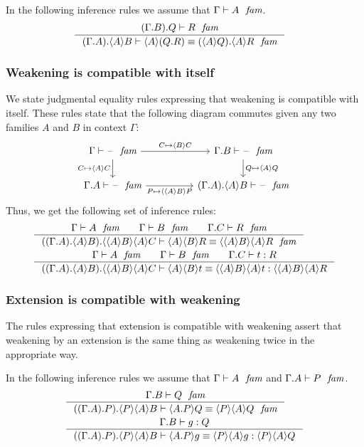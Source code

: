 In the following inference rules we assume that $\jfam{\Gamma}{A}$.
\begin{align}
& \inference
  {\jfam{{{\Gamma}{B}}{Q}}{R}}
  {\jfameq
    {\ctxext{{\Gamma}{A}}{\ctxwk{A}{B}}}
    {\ctxwk{A}{\ctxext{Q}{R}}}
    {\ctxext{\ctxwk{A}{Q}}{\ctxwk{A}{R}}}}
\end{align}

\subsubsection{Weakening is compatible with itself}\label{comp-ww}
We state judgmental equality rules expressing
that weakening is compatible with itself. These rules state that the following
diagram commutes given any two families $A$ and $B$ in context $\Gamma$:
\begin{equation*}
\begin{tikzcd}[column sep=huge]
\jfam{\Gamma}{\blank} \ar{r}{C\mapsto\ctxwk{B}{C}} \ar{d}[swap]{C\mapsto\ctxwk{A}{C}} & \jfam{{\Gamma}{B}}{\blank} \ar{d}{Q\mapsto\ctxwk{A}{Q}}\\
\jfam{{\Gamma}{A}}{\blank} \ar{r}[swap]{P\mapsto\ctxwk{{A}{B}}{P}} & \jfam{{{\Gamma}{A}}{\ctxwk{A}{B}}}{\blank}
\end{tikzcd}
\end{equation*}
Thus, we get the following set of inference rules:
\begin{align}
& \inference{\jfam{\Gamma}{A}\qquad\jfam{\Gamma}{B}\qquad\jfam{{\Gamma}{C}}{R}}
          {\jfameq{{{{\Gamma}{A}}{\ctxwk{A}{B}}}{\ctxwk{{A}{B}}{{A}{C}}}}
            {\ctxwk{A}{{B}{R}}}
            {\ctxwk{{A}{B}}{{A}{R}}}}\label{comp-ww-f}\\
& \inference{\jfam{\Gamma}{A}\qquad\jfam{\Gamma}{B}\qquad\jterm{{\Gamma}{C}}{R}{t}}
          {\jtermeq{{{{\Gamma}{A}}{\ctxwk{A}{B}}}{\ctxwk{{A}{B}}{{A}{C}}}}
            {\ctxwk{{A}{B}}{{A}{R}}}{\ctxwk{A}{{B}{t}}}{\ctxwk{{A}{B}}{{A}{t}}}}
            \label{comp-ww-t}
\end{align}

\subsubsection{Extension is compatible with weakening}\label{comp-ew}
The rules expressing that extension is compatible with weakening assert that
weakening by an extension is the same thing as weakening twice in the
appropriate way.

In the following inference rules we assume that
$\jfam{\Gamma}{A}$ and $\jfam{{\Gamma}{A}}{P}$. 
\begin{align}
& \inference{\jfam{{\Gamma}{B}}{Q}}
    {\jfameq{{{{\Gamma}{A}}{P}}{\ctxwk{P}{{A}{B}}}}{\ctxwk{\ctxext{A}{P}}{Q}}{\ctxwk{P}{{A}{Q}}}}\label{comp-ew-f}\\
& \inference{\jterm{{\Gamma}{B}}{Q}{g}}
    {\jtermeq{{{{\Gamma}{A}}{P}}{\ctxwk{P}{{A}{B}}}}{\ctxwk{P}{{A}{Q}}}{\ctxwk{\ctxext{A}{P}}{g}}{\ctxwk{P}{{A}{g}}}}\label{comp-ew-t}
\end{align}

